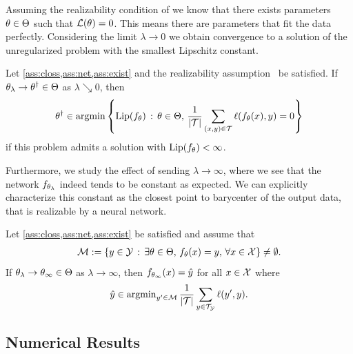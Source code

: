 Assuming the realizability condition of \cite{shalev2014understanding} we know that there exists parameters $\theta\in\Theta$ such that $\mathcal{L}(\theta)=0$. This means there are parameters that fit the data perfectly. Considering the limit $\lambda\to 0$ we obtain convergence to a solution of the unregularized problem with the smallest Lipschitz constant.
%
\begin{proposition}{\cite[Prop. 3]{bungert2021clip}}{}
Let \cref{ass:closs,ass:net,ass:exist} and the realizability assumption~\cite{shalev2014understanding} be satisfied. If $\theta_\lambda \to \theta^\dagger\in\Theta$ as $\lambda\searrow 0$, 
then
%
\begin{align*}
\theta^\dagger\in\operatorname{argmin}\left\lbrace \operatorname{Lip}(f_\theta) \,:\, \theta\in\Theta,\, \frac{1}{\left|\mathcal{T}\right|}
\sum_{(x,y)\in\mathcal{T}}\ell(f_{\theta}(x),y)
=0\right\rbrace
\end{align*}
%
if this problem admits a solution with $\operatorname{Lip}(f_\theta)<\infty$.
\end{proposition}
%
%
\noindent%
Furthermore, we study the effect of sending $\lambda\to\infty$, where we see that the network $f_{\theta_\lambda}$ indeed tends to be constant as expected. We can explicitly characterize this constant as the closest point to barycenter of the output data, that is realizable by a neural network. 
%
\begin{proposition}{\cite[Prop. 4]{bungert2021clip}}{}
Let \cref{ass:closs,ass:net,ass:exist} be satisfied and assume that 
\begin{align*}
\mathcal{M}:=
\left\{y\in\mathcal{\mathcal{Y}} \,:\, \exists\theta\in\Theta,\,
f_\theta(x)=y,\,\forall x\in\mathcal{X}\right\}\neq\emptyset.
\end{align*}
%
If $\theta_\lambda \to \theta_\infty \in\Theta$ as $\lambda\to \infty$, then $f_{\theta_\infty}(x)=\hat{y}$ for all $x\in\mathcal{X}$ where 
\begin{align*}
\hat{y}\in\operatorname{argmin}_{y'\in\mathcal{M}}
\frac{1}{\left|\mathcal{T}\right|}
\sum_{y\in\mathcal{T}_{\mathcal{\mathcal{Y}}}}\ell(y',y).
\end{align*}
\end{proposition} 
%
%
\clearpage%
\subsection{Numerical Results}\label{sec:CLIPNum}
%
 

